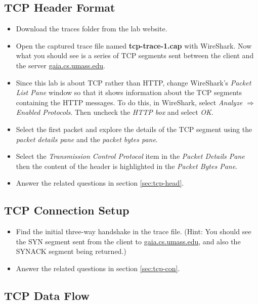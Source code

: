\subsection{TCP Header Format}
\begin{itemize}
\item Download the traces folder from the lab website.

\item Open the captured trace file named {\bf tcp-trace-1.cap} with
  WireShark.  Now what you should see is a series of TCP segments sent
  between the client  and the server \url{gaia.cs.umass.edu}.

\item Since this lab is about TCP rather than HTTP, change WireShark's
  {\em Packet List Pane} window so that it shows information about the
  TCP segments containing the HTTP messages.
  To do this, in WireShark, select {\em Analyze $\Rightarrow$ Enabled
    Protocols}. Then uncheck the {\em HTTP box} and select {\em OK}.
\item Select the first packet and explore the details of the TCP
  segment using the {\em packet details pane} and the {\em packet bytes
  pane}.
\item Select the {\em Transmission Control Protocol} item in the
  \emph{Packet Details Pane} then the content of the header is
  highlighted in the {\em Packet Bytes Pane}.
\item Answer the related questions in section \ref{sec:tcp-head}.

\end{itemize}

\subsection{TCP Connection Setup}

\begin{itemize}
\item Find the initial three-way handshake in the trace file. (Hint: 
  You should see the SYN segment sent from the client to 
  \url{gaia.cs.umass.edu}, and also the SYNACK segment being returned.)
\item Answer the related questions in section \ref{sec:tcp-con}.
\end{itemize}

\subsection{TCP Data Flow}

